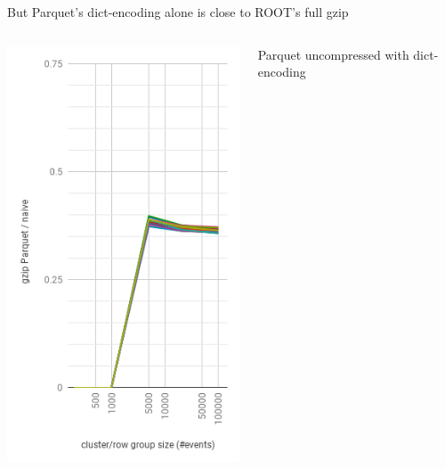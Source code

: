 \documentclass[aspectratio=169]{beamer}
\begin{document}
\begin{frame}{But Parquet's dict-encoding alone is close to ROOT's full gzip}
\begin{columns}
\begin{center}
\includegraphics[width=\linewidth]{parquet-gzip-2.png}
\end{center}
\begin{center}
Parquet uncompressed
with dict-encoding


\end{center}
\end{columns}
\end{frame}
\end{document}
